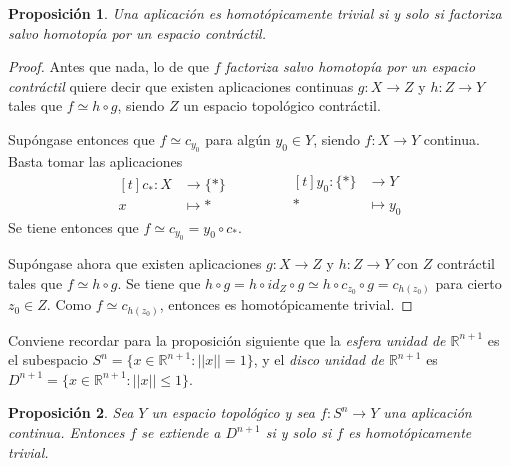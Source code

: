 \documentclass[11pt]{report}
\newtheorem{proposition}{Proposición}[chapter]
\theoremstyle{definition}
\theoremstyle{definition}
\theoremstyle{remark}
\newcommand{\R}{\mathbb R}
\begin{document}
\begin{proposition}
Una aplicación es homotópicamente trivial si y solo si factoriza salvo homotopía por un espacio contráctil.
\end{proposition}
\begin{proof}
Antes que nada, lo de que $f$ \textit{factoriza salvo homotopía por un espacio contráctil} quiere decir que existen aplicaciones continuas $g \colon X \to Z$ y $h \colon Z \to Y$ tales que $f \simeq h \circ g$, siendo $Z$ un espacio topológico contráctil.

\vspace{2mm}

Supóngase entonces que $f \simeq c_{y_0}$ para algún $y_0 \in Y$, siendo $f \colon X \to Y$ continua. Basta tomar las aplicaciones
\[
\begin{aligned}[t]
    c_\ast \colon X &\longrightarrow \{\ast\} \\
    x &\longmapsto \ast
\end{aligned} \qquad \qquad
\begin{aligned}[t]
    y_0 \colon \{\ast\} &\longrightarrow Y \\
    \ast &\longmapsto y_0
\end{aligned}
\]
Se tiene entonces que $f \simeq c_{y_0} = y_0 \circ c_\ast$.

\vspace{2mm}

Supóngase ahora que existen aplicaciones $g \colon X \to Z$ y $h \colon Z \to Y$ con $Z$ contráctil tales que $f \simeq h \circ g$. Se tiene que $h \circ g = h \circ id_Z \circ g \simeq h \circ c_{z_0} \circ g = c_{h(z_0)}$ para cierto $z_0 \in Z$. Como $f \simeq c_{h(z_0)}$, entonces es homotópicamente trivial.
\end{proof}

Conviene recordar para la proposición siguiente que la \textit{esfera unidad de $\R^{n+1}$} es el subespacio $S^n = \{x \in \R^{n+1} \colon ||x|| = 1\}$, y el \textit{disco unidad de $\R^{n+1}$} es $D^{n+1} = \{x \in \R^{n+1} \colon ||x||\leq 1\}$.

\begin{proposition}
\label{prop1.4.}
Sea $Y$ un espacio topológico y sea $f \colon S^n \to Y$ una aplicación continua. Entonces $f$ se extiende a $D^{n+1}$ si y solo si $f$ es homotópicamente trivial.
\end{proposition}
\end{document}
